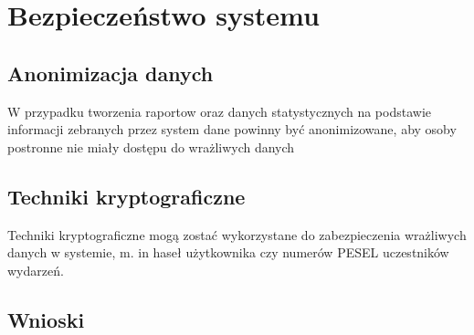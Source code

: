 \newpage\section{Bezpieczeństwo systemu \NazwaSys} \label{sec:bezpieczenstwo}
\subsection{Anonimizacja danych}
W przypadku tworzenia raportow oraz danych statystycznych na podstawie informacji zebranych przez system dane powinny być anonimizowane, aby osoby postronne nie miały dostępu do wrażliwych danych
\subsection{Techniki kryptograficzne}
Techniki kryptograficzne mogą zostać wykorzystane do zabezpieczenia wrażliwych danych w systemie, m. in haseł użytkownika czy numerów PESEL uczestników wydarzeń.
\subsection{Wnioski}
 
